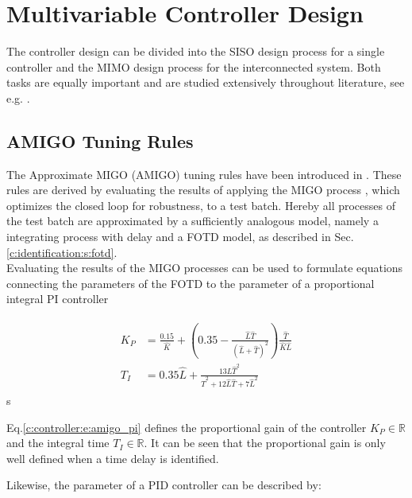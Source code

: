 \chapter{Multivariable Controller Design}%
\label{c:controller}

The controller design can be divided into the SISO design process for a single controller and the MIMO design process for the interconnected system. Both tasks are equally important and are studied extensively throughout literature, see e.g. \cite{Astrom2000a}.\\

\section{AMIGO Tuning Rules} %
\label{c:controller:s:AMIGO}

The Approximate MIGO (AMIGO) tuning rules have been introduced in \cite[p.225 ff.]{Astrom2006}. These rules are derived by evaluating the results of applying the MIGO process \cite[c 6.8]{Astrom2006}, which optimizes the closed loop for robustness, to a test batch. Hereby all processes of the test batch are approximated by a sufficiently analogous model, namely a integrating process with delay and a FOTD model, as described in Sec.\ref{c:identification:s:fotd}.  \\

Evaluating the results of the MIGO processes can be used to formulate equations connecting the parameters of the FOTD to the parameter of a proportional integral PI controller 

\begin{align}
\begin{split}
K_P &= \frac{0.15}{\hat{K}}+ \left(0.35 - \frac{\hat{L}\hat{T}}{\left( \hat{L}+\hat{T} \right)^2} \right) \frac{\hat{T}}{\hat{K}\hat{L}} \\
T_I &= 0.35 \hat{L} + \frac{13 \hat{L}\hat{T}^2}{\hat{T}^2 + 12 \hat{L}\hat{T}+7 \hat{L}^2}
\end{split}
\label{c:controller:e:amigo_pi}
\end{align}s

Eq.\ref{c:controller:e:amigo_pi} defines the proportional gain of the controller $K_P \in \mathbb{R}$ and the integral time $T_I \in \mathbb{R}$.
It can be seen that the proportional gain is only well defined when a time delay is identified.

Likewise, the parameter of a PID controller can be described by:

